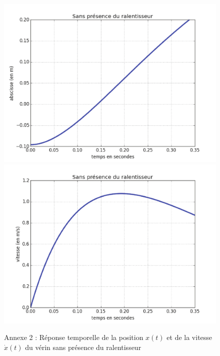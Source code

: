 \newpage

\begin{figure}[ht!]
\begin{center}
 \includegraphics[width=0.85\linewidth]{img/a21}\\
 \includegraphics[width=0.85\linewidth]{img/a22}
\end{center}
\caption{Annexe 2 : Réponse temporelle de la position $x(t)$ et de la vitesse $\dot{x}(t)$ du vérin sans présence du ralentisseur}
\label{a2}
\end{figure}

\newpage

